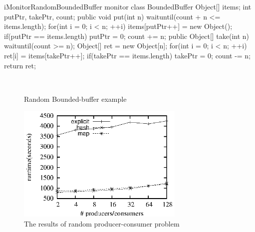 \documentclass[10pt, conference, compsocconf]{IEEEtran}
\begin{document}
\begin{SaveVerbatim}{iMonitorRandomBoundedBuffer}
monitor class BoundedBuffer { 
  Object[] items; 
  int putPtr, takePtr, count; 
  public void put(int n) { 
    waituntil(count + n <= items.length); 
    for(int i = 0; i < n; ++i) {
      items[putPtr++] = new Object(); 
      if(putPtr == items.length) { 
        putPtr = 0; 
      } 
    }
    count += n; 
  } 
  public Object[] take(int n) { 
    waituntil(count >= n);
    Object[] ret = new Object[n];
    for(int i = 0; i < n; ++i) {
      ret[i] = items[takePtr++]; 
      if(takePtr == items.length) { 
        takePtr = 0; 
      }
    }
    count -= n;
    return ret;
  }
}
\end{SaveVerbatim}

\begin{figure}
  \centering
  \\
  \caption{Random Bounded-buffer example}
  \label{fig:rbb_exp}
\end{figure}
\begin{figure}[ht!]
  \centering
  \includegraphics[width=80mm]{fig/rpc.eps}
  \caption{The results of random producer-consumer problem}
  \label{fig:rpc_eval}
\end{figure}

%
\end{document}
